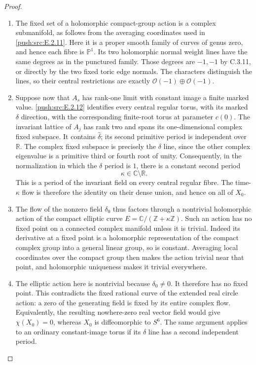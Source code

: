 \begin{proof}
\begin{enumerate}[label={$\langle1\rangle$\arabic*.},leftmargin=*]
\item The fixed set of a holomorphic compact-group
action is a complex submanifold, as follows
from the averaging coordinates used in
\ref{push:src:E.2.11}.  Here it is a proper smooth family
of curves of genus zero, and hence each fibre
is $\mathbb P^1$.  Its two holomorphic normal
weight lines have the same degrees as in
the punctured family.  Those degrees are
$-1,-1$ by C.3.11, or directly by the two
fixed toric edge normals.  The characters
distinguish the lines, so their central
restrictions are exactly
$\mathcal O(-1)\oplus\mathcal O(-1)$.

\item Suppose now that $A_s$ has rank-one limit
with constant image a finite marked value.
\ref{push:src:E.2.12} identifies every central regular
torus, with its marked $\delta$ direction,
with the corresponding finite-root torus
at parameter $c(0)$.  The invariant lattice
of $A_j$ has rank two and spans its
one-dimensional complex fixed subspace.
It contains $\widehat\delta$; its second
primitive period is independent over
$\mathbb R$.  The complex fixed subspace
is precisely the $\delta$ line, since
the other complex eigenvalue is a
primitive third or fourth root of unity.
Consequently, in the normalization in
which the $\delta$ period is $1$, there
is a constant second period
\[
 \kappa\in\mathbb C\setminus\mathbb R.
\]
This is a period of the invariant field
on every central regular fibre.  The
time-$\kappa$ flow is therefore the
identity on their dense union, and
hence on all of $X_0$.

\item The flow of the nonzero field $\delta_0$
thus factors through a nontrivial
holomorphic action of the compact
elliptic curve
$E=\mathbb C/(\mathbb Z+\kappa\mathbb Z)$.
Such an action has no fixed point on
a connected complex manifold unless
it is trivial.  Indeed its derivative
at a fixed point is a holomorphic
representation of the compact complex
group into a general linear group,
so is constant.  Averaging local
coordinates over the compact group
then makes the action trivial near
that point, and holomorphic uniqueness
makes it trivial everywhere.

\item The elliptic action here is nontrivial
because $\delta_0\ne0$.  It therefore
has no fixed point.  This contradicts
the fixed rational curve of the
extended real circle action: a zero
of the generating field is fixed
by its entire complex flow.  Equivalently,
the resulting nowhere-zero real vector
field would give $\chi(X_0)=0$,
whereas $X_0$ is diffeomorphic to $S^6$.
The same argument applies to an ordinary
constant-image torus if its $\delta$
line has a second independent period.

\end{enumerate}
\end{proof}
